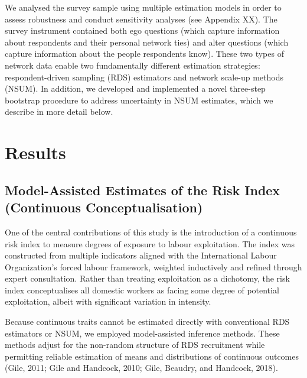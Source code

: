 \documentclass[
  12pt,
  letterpaper,
  DIV=11,
  numbers=noendperiod]{scrartcl}
\theoremstyle{plain}
\theoremstyle{definition}
\begin{document}
We analysed the survey sample using multiple estimation models in order
to assess robustness and conduct sensitivity analyses (see Appendix XX).
The survey instrument contained both ego questions (which capture
information about respondents and their personal network ties) and alter
questions (which capture information about the people respondents know).
These two types of network data enable two fundamentally different
estimation strategies: respondent-driven sampling (RDS) estimators and
network scale-up methods (NSUM). In addition, we developed and
implemented a novel three-step bootstrap procedure to address
uncertainty in NSUM estimates, which we describe in more detail below.

\section{Results}\label{results}

\subsection{Model-Assisted Estimates of the Risk Index (Continuous
Conceptualisation)}\label{model-assisted-estimates-of-the-risk-index-continuous-conceptualisation}

One of the central contributions of this study is the introduction of a
continuous risk index to measure degrees of exposure to labour
exploitation. The index was constructed from multiple indicators aligned
with the International Labour Organization's forced labour framework,
weighted inductively and refined through expert consultation. Rather
than treating exploitation as a dichotomy, the risk index conceptualises
all domestic workers as facing some degree of potential exploitation,
albeit with significant variation in intensity.

Because continuous traits cannot be estimated directly with conventional
RDS estimators or NSUM, we employed model-assisted inference methods.
These methods adjust for the non-random structure of RDS recruitment
while permitting reliable estimation of means and distributions of
continuous outcomes (Gile, 2011; Gile and Handcock, 2010; Gile, Beaudry,
and Handcock, 2018).
\end{document}
